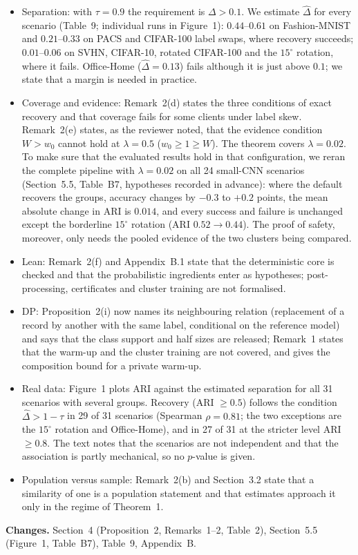\documentclass[11pt]{article}
\newcommand{\chg}{\par\noindent\textbf{Changes.} }
\begin{document}
\begin{itemize}[leftmargin=*,itemsep=1pt]
\item Separation: with $\tau=0.9$ the requirement is $\Delta>0.1$. We estimate $\hat\Delta$ for every scenario (Table~9; individual runs in Figure~1): $0.44$--$0.61$ on Fashion-MNIST and $0.21$--$0.33$ on PACS and CIFAR-100 label swaps, where recovery succeeds; $0.01$--$0.06$ on SVHN, CIFAR-10, rotated CIFAR-100 and the $15^\circ$ rotation, where it fails. Office-Home ($\hat\Delta=0.13$) fails although it is just above $0.1$; we state that a margin is needed in practice.
\item Coverage and evidence: Remark~2(d) states the three conditions of exact recovery and that coverage fails for some clients under label skew. Remark~2(e) states, as the reviewer noted, that the evidence condition $W>w_0$ cannot hold at $\lambda=0.5$ ($w_0\ge1\ge W$). The theorem covers $\lambda=0.02$. To make sure that the evaluated results hold in that configuration, we reran the complete pipeline with $\lambda=0.02$ on all 24 small-CNN scenarios (Section~5.5, Table~B7, hypotheses recorded in advance): where the default recovers the groups, accuracy changes by $-0.3$ to $+0.2$ points, the mean absolute change in ARI is $0.014$, and every success and failure is unchanged except the borderline $15^\circ$ rotation (ARI $0.52\to0.44$). The proof of safety, moreover, only needs the pooled evidence of the two clusters being compared.
\item Lean: Remark~2(f) and Appendix~B.1 state that the deterministic core is checked and that the probabilistic ingredients enter as hypotheses; post-processing, certificates and cluster training are not formalised.
\item DP: Proposition~2(i) now names its neighbouring relation (replacement of a record by another with the same label, conditional on the reference model) and says that the class support and half sizes are released; Remark~1 states that the warm-up and the cluster training are not covered, and gives the composition bound for a private warm-up.
\item Real data: Figure~1 plots ARI against the estimated separation for all 31 scenarios with several groups. Recovery (ARI $\ge0.5$) follows the condition $\hat\Delta>1-\tau$ in 29 of 31 scenarios (Spearman $\rho=0.81$; the two exceptions are the $15^\circ$ rotation and Office-Home), and in 27 of 31 at the stricter level ARI $\ge0.8$. The text notes that the scenarios are not independent and that the association is partly mechanical, so no $p$-value is given.
\item Population versus sample: Remark~2(b) and Section~3.2 state that a similarity of one is a population statement and that estimates approach it only in the regime of Theorem~1.
\end{itemize}
\chg Section~4 (Proposition~2, Remarks~1--2, Table~2), Section~5.5 (Figure~1, Table~B7), Table~9, Appendix~B.
\end{document}
